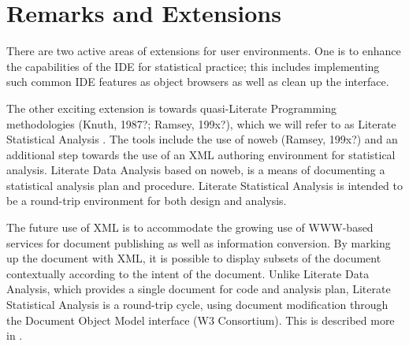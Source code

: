 \documentclass{article}
\begin{document}
\section{Remarks and Extensions}
\label{sec:remarks}

There are two active areas of extensions for user environments.  One
is to enhance the capabilities of the IDE for statistical practice;
this includes implementing such common IDE features as object browsers
as well as clean up the interface.

The other exciting extension is towards quasi-Literate Programming
methodologies (Knuth, 1987?; Ramsey, 199x?), which we will refer to as
Literate Statistical Analysis \citep{ross:lunt:2001}. The tools include
the use of noweb (Ramsey, 199x?) and an additional step towards the
use of an XML authoring environment for statistical analysis.
Literate Data Analysis based on noweb, is a means of documenting a
statistical analysis plan and procedure.  Literate Statistical
Analysis is intended to be a round-trip environment for both design
and analysis.

The future use of XML is to accommodate the growing use of WWW-based
services for document publishing as well as information conversion.
By marking up the document with XML, it is possible to display subsets
of the document contextually according to the intent of the document.
Unlike Literate Data Analysis, which provides a single document for
code and analysis plan, Literate Statistical Analysis is a round-trip
cycle, using document modification through the Document Object Model
interface (W3 Consortium).  This is described more in
\citep{ross:lunt:2001}. 



\end{document}
